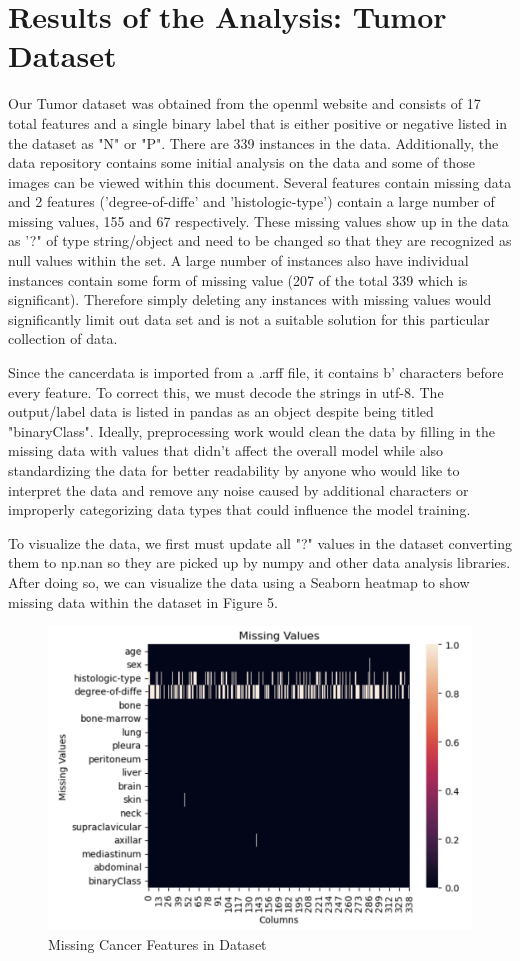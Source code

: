 \documentclass[titlepage]{article}
\begin{document}
\section*{Results of the Analysis: Tumor Dataset}
Our Tumor dataset was obtained from the openml website \cite{dataset1} and consists of 17 total features and a single binary label that is either positive or negative listed in the dataset as "N" or "P".  There are 339 instances in the data.  Additionally, the data repository contains some initial analysis on the data and some of those images can be viewed within this document. Several features contain missing data and 2 features ('degree-of-diffe' and 'histologic-type') contain a large number of missing values, 155 and 67 respectively. These missing values show up in the data as '?" of type string/object and need to be changed so that they are recognized as null values within the set.  A large number of instances also have individual instances contain some form of missing value (207 of the total 339 which is significant). Therefore simply deleting any instances with missing values would significantly limit out data set and is not a suitable solution for this particular collection of data.  

\vspace{.5cm}\noindent Since the cancerdata is imported from a .arff file, it contains b' characters before every feature. To correct this, we must decode the strings in utf-8. The output/label data is listed in pandas as an object despite being titled "binaryClass". Ideally, preprocessing work would clean the data by filling in the missing data with values that didn't affect the overall model while also standardizing the data for better readability by anyone who would like to interpret the data and remove any noise caused by additional characters or improperly categorizing data types that could influence the model training.  

\vspace{.5cm}\noindent To visualize the data, we first must update all "?" values in the dataset converting them to np.nan so they are picked up by numpy \cite{numpyisnan} and other data analysis libraries.  After doing so, we can visualize the data using a Seaborn \cite{seaborn} heatmap to show missing data within the dataset in Figure 5.  

\begin{figure}
	\centering
	\includegraphics[width=0.65\linewidth]{img/cancerheatmap.png}
	\caption{Missing Cancer Features in Dataset}
	\label{fig:cancerheatmap}
\end{figure}
\end{document}
